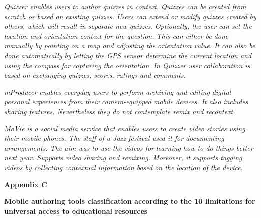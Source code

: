 \begin{small}
\em Quizzer \em \cite{Giemza2012} enables users to author quizzes in context. Quizzes can be created from scratch or based on existing quizzes. Users can extend or modify quizzes created by others, which will result in separate new quizzes. Optionally, the user can set the location and orientation context for the question. This can either be done manually by pointing on a map and adjusting the orientation value. It can also be done automatically by letting the GPS sensor determine the current location and using the compass for capturing the orientation. In \em Quizzer \em user collaboration is based on exchanging quizzes, scores, ratings and comments.

\em mProducer \em \cite{Wu2006} enables everyday users to perform archiving and editing digital personal experiences from their camera-equipped mobile devices. It also includes sharing features. Nevertheless they do not contemplate remix and recontext.

\em MoVie \em \cite{Multisilta2010} is a social media service that enables users to create video stories using their mobile phones. The staff of a Jazz festival used it for documenting arrangements. The aim was to use the videos for learning how to do things better next year. Supports video sharing and remixing. Moreover, it supports tagging videos by collecting contextual information based on the location of the device.

\end{small}



\clearpage{\pagestyle{empty}\cleardoublepage}

\begin{Large}
\textbf{Appendix C} 
\end{Large}
\vspace{3em}

\textbf{Mobile authoring tools classification according to the 10 limitations for universal access to educational resources}

